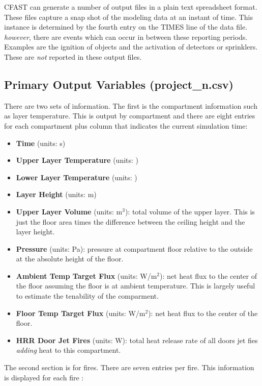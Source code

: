 CFAST can generate a number of output files in a plain text spreadsheet format.  These files capture a snap shot of the modeling data at an instant of time. This instance is determined by the fourth entry on the TIMES line of the data file. \emph{however}, there are events which can occur in between these reporting periods. Examples are the ignition of objects and the activation of detectors or sprinklers. These are \emph{not} reported in these output files.

\subsection{Primary Output Variables (project\_n.csv)}

There are two sets of information. The first is the compartment information such as layer temperature. This is output by compartment and there are eight entries for each compartment plus column that indicates the current simulation time:

\begin{itemize}
\item \textbf{Time} (units: s)
\item \textbf{Upper Layer Temperature} (units: \degc)
\item \textbf{Lower Layer Temperature} (units: \degc)
\item \textbf{Layer Height}  (units: m)
\item\textbf{ Upper Layer Volume} (units: m$^3$): total volume of the upper layer. This is just the floor area times the difference between the ceiling height and the layer height.
\item\textbf{ Pressure} (units: Pa): pressure at compartment floor relative to the outside at the absolute height of the floor.
\item \textbf{Ambient Temp Target Flux} (units: W/m$^2$): net heat flux to the center of the floor assuming the floor is at ambient temperature.  This is largely useful to estimate the tenability of the comparment.
\item \textbf{Floor Temp Target Flux} (units: W/m$^2$): net heat flux to the center of the floor.
\item \textbf{HRR Door Jet Fires} (units: W): total heat release rate of all doors jet fies \emph{adding} heat to this compartment.
\end{itemize}

The second section is for fires. There are seven entries per fire.  This information is displayed for each fire :

